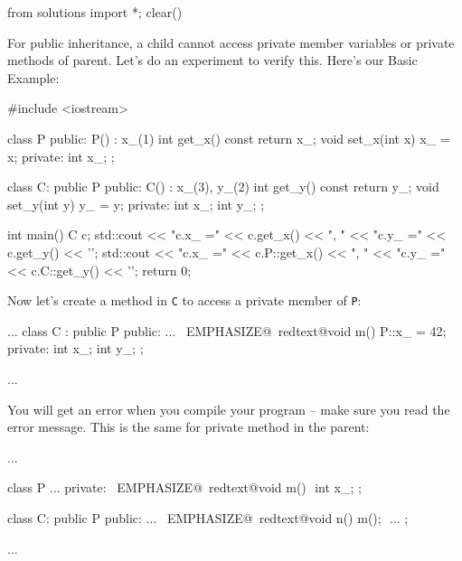 \begin{python0}
from solutions import *; clear()
\end{python0}

For public inheritance, a child cannot access private member variables
or private methods of parent. Let's do an experiment to verify this.
Here's our Basic Example:
\begin{console}
#include <iostream>

class P
{
public:
        P() : x_(1) {}
        int get_x() const { return x_; }
        void set_x(int x) { x_ = x; }
private:
        int x_;
};

class C: public P
{
public:
        C() : x_(3), y_(2) {}
        int get_y() const { return y_; }
        void set_y(int y) { y_ = y; }
private:
        int x_;
        int y_;
};

int main()
{   
    C c;
    std::cout << "c.x_ =" << c.get_x() << ", "
              << "c.y_ =" << c.get_y() << '\n';
    std::cout << "c.x_ =" << c.P::get_x() << ", "
              << "c.y_ =" << c.C::get_y() << '\n';
return 0;
}
\end{console}

Now let's create a method in \verb!C! to access a private member of
\verb!P!:
\begin{console}[commandchars=\~\@\$]
...
class C : public P
{
public:
        ...
        ~EMPHASIZE@~redtext@void m() { P::x_ = 42; }$$
private:
        int x_;
        int y_;
};

... 
\end{console}

You will get an error when you compile your program -- make sure you
read the error message. This is the same for private method in the
parent:
\begin{console}[commandchars=\~\@\$]
...

class P
{     
...
private:
        ~EMPHASIZE@~redtext@void m() {}$$
        int x_;
};

class C: public P
{
public:
        ...
        ~EMPHASIZE@~redtext@void n() { m(); }$$
        ...
};

...
\end{console}

